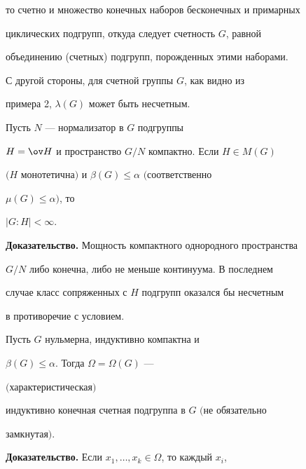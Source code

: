 то счетно и множество конечных наборов бесконечных и примарных  


циклических подгрупп, откуда следует счетность $G$, равной  


объединению (счетных) подгрупп, порожденных этими наборами. 


 


С другой стороны, для счетной группы $G$, как видно из  


примера 2, $\lambda(G)$ может быть несчетным. 


 


\begin{lem} 


Пусть $N$ --- нормализатор в $G$ подгруппы  


$H=\ov H$ и пространство $G/N$ компактно. Если $H\in M(G)$ 


$(H$ монотетична$)$ и $\beta(G)\le\alpha$ $($соответственно 


$\mu(G)\le\alpha)$, то  


$|G{:}H|<\infty$. 


\end{lem} 


 


{\bf Доказательство.} Мощность компактного однородного пространства 


$G/N$ либо конечна, либо не меньше континуума. В последнем 


случае класс сопряженных с $H$ подгрупп оказался бы несчетным 


в противоречие с условием. 


 


\begin{lem} 


Пусть $G$ нульмерна, индуктивно компактна и  


$\beta(G)\le\alpha$. Тогда $\Omega=\Omega(G)$ --- 


$($характеристическая$)$  


индуктивно конечная счетная подгруппа в $G$ $($не обязательно  


замкну\-тая$)$.  


\end{lem} 


 


{\bf Доказательство.} Если $x_1,\dotsc,x_k\in\Omega$, то каждый $x_i$, 


